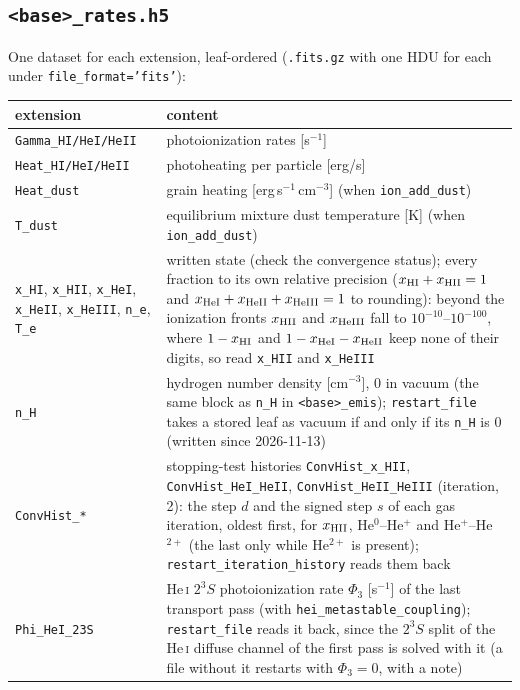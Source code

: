 \documentclass[english,a4paper]{my_memo}
\newcommand{\code}[1]{\texttt{#1}}
\begin{document}
\subsection{\code{<base>\_rates.h5}}
One dataset for each extension, leaf-ordered (\code{.fits.gz} with one HDU for each under \code{file\_format='fits'}):
\begin{center}\small
\begin{tabular}{lp{9.5cm}}
\toprule
extension & content \\
\midrule
\code{Gamma\_HI/HeI/HeII} & photoionization rates [s$^{-1}$] \\
\code{Heat\_HI/HeI/HeII} & photoheating per particle [erg/s] \\
\code{Heat\_dust} & grain heating [erg\,s$^{-1}$\,cm$^{-3}$] (when \code{ion\_add\_dust}) \\
\code{T\_dust} & equilibrium mixture dust temperature [K] (when \code{ion\_add\_dust}) \\
\code{x\_HI}, \code{x\_HII}, \code{x\_HeI}, \code{x\_HeII}, \code{x\_HeIII}, \code{n\_e}, \code{T\_e} & written state (check the convergence status); every fraction to its own relative precision ($x_{\rm HI} + x_{\rm HII} = 1$ and $x_{\rm HeI} + x_{\rm HeII} + x_{\rm HeIII} = 1$ to rounding): beyond the ionization fronts $x_{\rm HII}$ and $x_{\rm HeIII}$ fall to $10^{-10}$--$10^{-100}$, where $1 - x_{\rm HI}$ and $1 - x_{\rm HeI} - x_{\rm HeII}$ keep none of their digits, so read \code{x\_HII} and \code{x\_HeIII} \\
\code{n\_H} & hydrogen number density [cm$^{-3}$], 0 in vacuum (the same block as \code{n\_H} in \code{<base>\_emis}); \code{restart\_file} takes a stored leaf as vacuum if and only if its \code{n\_H} is 0 (written since 2026-11-13) \\
\code{ConvHist\_*} & stopping-test histories \code{ConvHist\_x\_HII}, \code{ConvHist\_HeI\_HeII}, \code{ConvHist\_HeII\_HeIII} (iteration, 2): the step $d$ and the signed step $s$ of each gas iteration, oldest first, for $x_{\rm HII}$, He$^0$--He$^+$ and He$^+$--He$^{2+}$ (the last only while He$^{2+}$ is present); \code{restart\_iteration\_history} reads them back \\
\code{Phi\_HeI\_23S} & He\,\textsc{i} $2^3S$ photoionization rate $\Phi_3$ [s$^{-1}$] of the last transport pass (with \code{hei\_metastable\_coupling}); \code{restart\_file} reads it back, since the $2^3S$ split of the He\,\textsc{i} diffuse channel of the first pass is solved with it (a file without it restarts with $\Phi_3 = 0$, with a note) \\

\end{tabular}
\end{center}
\end{document}

